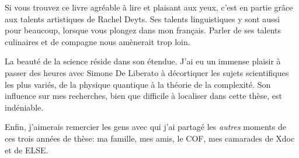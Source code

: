 Si vous trouvez ce livre agréable à lire et plaisant aux yeux, c'est
en partie grâce aux talents artistiques de Rachel Deyts. Ses talents
linguistiques y sont aussi pour beaucoup, lorsque vous plongez dans
mon français. Parler de ses talents culinaires et de compagne nous
amènerait trop loin.

La beauté de la science réside dans son étendue. J'ai eu un immense
plaisir à passer des heures avec Simone De Liberato à décortiquer les
sujets scientifiques les plus variés, de la physique quantique à la
théorie de la complexité. Son influence sur mes recherches, bien que
difficile à localiser dans cette thèse, est indéniable.

Enfin, j'aimerais remercier les gens avec qui j'ai partagé les
\emph{autres} moments de ces trois années de thèse: ma famille, mes
amis, le COF, mes camarades de Xdoc et de ELSE.



